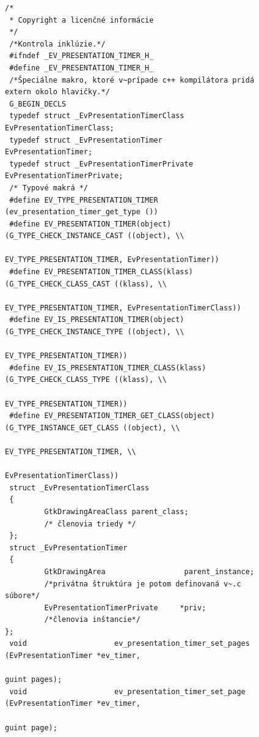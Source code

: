 \documentclass[12pt,oneside,final]{fithesis2}
\begin{document}
\begin{figure}[hb]
\begin{tiny}
\begin{verbatim}
/*
 * Copyright a licenčné informácie
 */
 /*Kontrola inklúzie.*/
 #ifndef _EV_PRESENTATION_TIMER_H_
 #define _EV_PRESENTATION_TIMER_H_
 /*Špeciálne makro, ktoré v~prípade c++ kompilátora pridá extern okolo hlavičky.*/
 G_BEGIN_DECLS
 typedef struct _EvPresentationTimerClass        EvPresentationTimerClass;
 typedef struct _EvPresentationTimer             EvPresentationTimer;
 typedef struct _EvPresentationTimerPrivate      EvPresentationTimerPrivate;
 /* Typové makrá */
 #define EV_TYPE_PRESENTATION_TIMER              (ev_presentation_timer_get_type ())
 #define EV_PRESENTATION_TIMER(object)           (G_TYPE_CHECK_INSTANCE_CAST ((object), \\
                                                  EV_TYPE_PRESENTATION_TIMER, EvPresentationTimer))
 #define EV_PRESENTATION_TIMER_CLASS(klass)      (G_TYPE_CHECK_CLASS_CAST ((klass), \\
                                                  EV_TYPE_PRESENTATION_TIMER, EvPresentationTimerClass))
 #define EV_IS_PRESENTATION_TIMER(object)        (G_TYPE_CHECK_INSTANCE_TYPE ((object), \\
                                                  EV_TYPE_PRESENTATION_TIMER))
 #define EV_IS_PRESENTATION_TIMER_CLASS(klass)   (G_TYPE_CHECK_CLASS_TYPE ((klass), \\
                                                  EV_TYPE_PRESENTATION_TIMER))
 #define EV_PRESENTATION_TIMER_GET_CLASS(object) (G_TYPE_INSTANCE_GET_CLASS ((object), \\
                                                  EV_TYPE_PRESENTATION_TIMER, \\
                                                  EvPresentationTimerClass))
 struct _EvPresentationTimerClass
 {
         GtkDrawingAreaClass parent_class;
         /* členovia triedy */
 };
 struct _EvPresentationTimer 
 {
         GtkDrawingArea                  parent_instance;
         /*privátna štruktúra je potom definovaná v~.c súbore*/
         EvPresentationTimerPrivate     *priv;
         /*členovia inštancie*/ 
};
 void                    ev_presentation_timer_set_pages         (EvPresentationTimer *ev_timer,
                                                                  guint pages);
 void                    ev_presentation_timer_set_page          (EvPresentationTimer *ev_timer,
                                                                  guint page);

\end{verbatim}
\end{tiny}
\end{figure}
\end{document}
